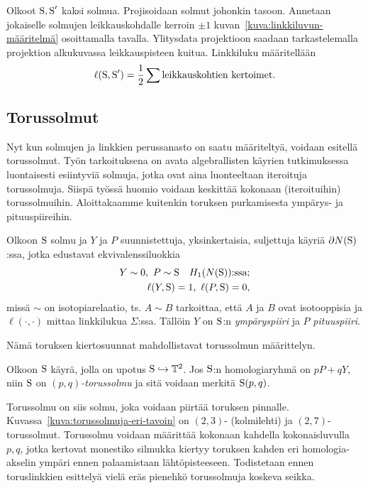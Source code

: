 \begin{maaritelma}
    Olkoot $\text{S},\text{S}'$ kaksi solmua. Projisoidaan solmut johonkin tasoon. Annetaan jokaiselle solmujen leikkauskohdalle kerroin $\pm1$ kuvan~\ref{kuva:linkkiluvun-määritelmä} osoittamalla tavalla. Ylitysdata projektioon saadaan tarkastelemalla projektion alkukuvassa leikkauspisteen kuitua. Linkkiluku määritellään
    \begin{equation*}
        \ell(\text{S},\text{S}')=\frac{1}{2}\sum\text{leikkauskohtien kertoimet}.
    \end{equation*}
    \label{maar:linkkiluku}
\end{maaritelma}


\subsection{Torussolmut}
Nyt kun solmujen ja linkkien perussanasto on saatu määriteltyä, voidaan esitellä torussolmut. Työn tarkoituksena on avata algebrallisten käyrien tutkimuksessa luontaisesti esiintyviä solmuja, jotka ovat aina luonteeltaan iteroituja torussolmuja. Siispä työssä huomio voidaan keskittää kokonaan (iteroituihin) torussolmuihin. Aloittakaamme kuitenkin toruksen purkamisesta ympärys- ja pituuspiireihin.
\begin{maaritelma}
    Olkoon $\text{S}$ solmu ja $Y$ ja $P$ suunnistettuja, yksinkertaisia, suljettuja käyriä $\partial N(\text{S})$:ssa, jotka edustavat ekvivalenssiluokkia
    \begin{align*}
        Y\sim0,\ P\sim\text{S}\quad H_1(N(\text{S}))\text{:ssa}; \\
        \ell(Y,\text{S})=1,\ \ell(P,\text{S})=0,
    \end{align*}
    missä $\sim$ on isotopiarelaatio, ts. $A\sim B$ tarkoittaa, että $A$ ja $B$ ovat isotooppisia ja $\ell(\cdot,\cdot)$ mittaa linkkilukua $\Sigma$:ssa. Tällöin $Y$ on $\text{S}$:n \emph{ympäryspiiri} ja $P$ \emph{pituuspiiri}.
\end{maaritelma}
Nämä toruksen kiertosuunnat mahdollistavat torussolmun määrittelyn.
\begin{maaritelma}
    Olkoon $\text{S}$ käyrä, jolla on upotus $\text{S}\hookrightarrow\mathbb{T}^2$. Jos $\text{S}$:n homologiaryhmä on $pP+qY$, niin $\text{S}$ on \emph{$(p,q)$-torussolmu} ja sitä voidaan merkitä $\text{S}(p,q)$.
    \label{maar:torussolmu}
\end{maaritelma}
Torussolmu on siis solmu, joka voidaan piirtää toruksen pinnalle. Kuvassa~\ref{kuva:torussolmuja-eri-tavoin} on $(2,3)$- (kolmilehti) ja $(2,7)$-torussolmut. Torussolmu voidaan määrittää kokonaan kahdella kokonaisluvulla $p,q$, jotka kertovat monestiko silmukka kiertyy toruksen kahden eri homologia-akselin ympäri ennen palaamistaan lähtöpisteeseen. Todistetaan ennen toruslinkkien esittelyä vielä eräs pienehkö torussolmuja koskeva seikka.
